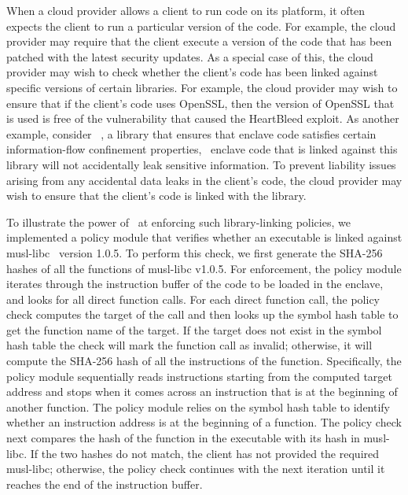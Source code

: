 %
When a cloud provider allows a client to run code on its platform, it often
expects the client to run a particular version of the code. For example, the
cloud provider may require that the client execute a version of the code that
has been patched with the latest security updates. As a special case of this,
the cloud provider may wish to check whether the client's code has been linked
against specific versions of certain libraries. For example, the cloud provider
may wish to ensure that if the client's code uses OpenSSL, then the version of
OpenSSL that is used is free of the vulnerability that caused the HeartBleed
exploit. As another example, consider
~\cite{moatplus:pldi16}, a library that ensures that
enclave code satisfies certain information-flow confinement properties,
\ie~enclave code that is linked against this library will not accidentally leak
sensitive information. To prevent liability issues arising from any accidental
data leaks in the client's code, the cloud provider may wish to ensure that the
client's code is linked with the  library. 

To illustrate the power of \tool\ at enforcing such library-linking policies,
we implemented a policy module that verifies whether an executable is linked
against musl-libc~\cite{musllibc} version 1.0.5. To perform this check, we
first generate the SHA-256 hashes of all the functions of musl-libc v1.0.5.
For enforcement, the policy module iterates through the instruction buffer of
the code to be loaded in the enclave, and looks for all direct function calls.
For each direct function call, the policy check computes the target of the call
and then looks up the symbol hash table to get the function name of the target.
If the target does not exist in the symbol hash table the check will mark the
function call as invalid; otherwise, it will compute the SHA-256 hash of all
the instructions of the function. Specifically, the policy module sequentially reads instructions starting from 
the computed target address and stops when it comes across an instruction that 
is at the beginning of another function. The policy module relies on the symbol hash
table to identify whether an instruction address is at the beginning of a function. The policy check next compares the hash of the
function in the executable with its hash in musl-libc. If the two hashes do not
match, the client has not provided the required musl-libc; otherwise, the
policy check continues with the next iteration until it reaches the end of the
instruction buffer.


